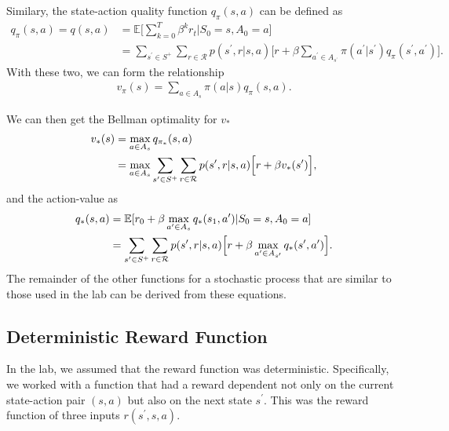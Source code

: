 Similary, the state-action quality function $q_\pi(s,a)$ can be defined as
\begin{subequations}
    \label{eq:state_action_value}
    \begin{align}
        q_{\pi}(s,a)=q(s,a) &= \mathbb{E} \Biggl[ \sum_{k=0}^T \beta^k r_t \Biggl\lvert S_0=s, A_0=a  \Biggr] \label{eq:state_action_val_def} \\
                            &= \sum_{s^\prime\in S^+}\sum_{r \in\mathcal{R}}p(s^\prime,r|s,a) \Biggl[r + \beta \sum_{a^\prime\in A_{s^\prime}} \pi(a^\prime|s^\prime) q_\pi(s^\prime,a^\prime)\Biggr] \label{eq:state_action_val_bell}.
    \end{align}
\end{subequations}
With these two, we can form the relationship
\begin{align}
    v_\pi(s) = \sum_{a\in A_s} \pi(a|s)q_{\pi}(s,a).
    \label{eq:value_quality_relationship}
\end{align}

We can then get the Bellman optimality for $v_*$
\begin{align}
    v_*(s) &= \max_{a\in A_s} q_{\pi_*}(s,a) \nonumber \\
           &= \max_{a\in A_s} \sum_{s^\prime\in S^+}\sum_{r\in\mathcal{R}}p(s^\prime,r|s,a) \Bigl[r + \beta v_*(s^\prime)\Bigr],
    \label{eq:state_value_bell_optimal}
\end{align}
and the action-value as
\begin{align}
    q_*(s,a) &= \mathbb{E}[r_0 + \beta\max_{a^\prime\in A_s} q_*(s_1,a^\prime)|S_0=s,A_0=a] \nonumber \\\
             &= \sum_{s^\prime\in S^+} \sum_{r\in\mathcal{R}} p(s^\prime,r|s,a) \Bigl[r + \beta\max_{a^\prime\in A_{s^\prime}} q_*(s^\prime,a^\prime)\Bigr].
    \label{eq:action_value_bell_optimal}
\end{align}
The remainder of the other functions for a stochastic process that are similar to those used in the lab can be derived from these equations.

\subsection*{Deterministic Reward Function}
In the lab, we assumed that the reward function was deterministic.
Specifically, we worked with a function that had a reward dependent not only on the current state-action pair $(s,a)$ but also on the next state $s^\prime$.
This was the reward function of three inputs $r(s^\prime,s,a)$.

